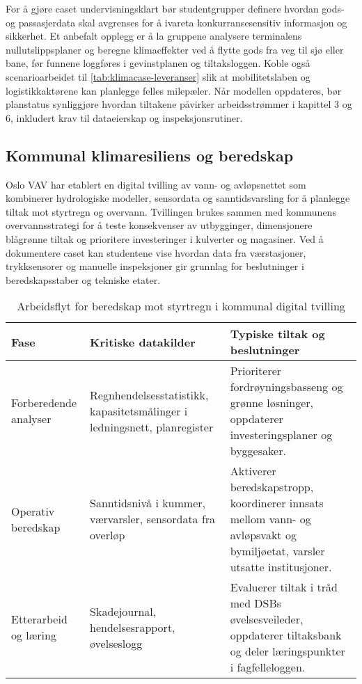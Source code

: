 For å gjøre caset undervisningsklart bør studentgrupper definere hvordan gods- og passasjerdata skal avgrenses for å ivareta konkurransesensitiv informasjon og sikkerhet. Et anbefalt opplegg er å la gruppene analysere terminalens nullutslippsplaner og beregne klimaeffekter ved å flytte gods fra veg til sjø eller bane, før funnene loggføres i gevinstplanen og tiltaksloggen. Koble også scenarioarbeidet til \autoref{tab:klimacase-leveranser} slik at mobilitetslaben og logistikkaktørene kan planlegge felles milepæler. Når modellen oppdateres, bør planstatus synliggjøre hvordan tiltakene påvirker arbeidsstrømmer i kapittel 3 og 6, inkludert krav til dataeierskap og inspeksjonsrutiner.

\subsection*{Kommunal klimaresiliens og beredskap}
Oslo VAV har etablert en digital tvilling av vann- og avløpsnettet som kombinerer hydrologiske modeller, sensordata og sanntidsvarsling for å planlegge tiltak mot styrtregn og overvann.\citep{oslovav2023digital} Tvillingen brukes sammen med kommunens overvannsstrategi for å teste konsekvenser av utbygginger, dimensjonere blågrønne tiltak og prioritere investeringer i kulverter og magasiner.\citep{oslo2023overvann} Ved å dokumentere caset kan studentene vise hvordan data fra værstasjoner, trykksensorer og manuelle inspeksjoner gir grunnlag for beslutninger i beredskapsstaber og tekniske etater.

\begin{table}[h]
    \centering
    \caption{Arbeidsflyt for beredskap mot styrtregn i kommunal digital tvilling}
    \label{tab:kommunal-beredskap}
    \begin{tabular}{p{3.4cm}p{4.5cm}p{5.0cm}}
        \toprule
        Fase & Kritiske datakilder & Typiske tiltak og beslutninger \\
        \midrule
        Forberedende analyser & Regnhendelsesstatistikk, kapasitetsmålinger i ledningsnett, planregister & Prioriterer fordrøyningsbasseng og grønne løsninger, oppdaterer investeringsplaner og byggesaker. \\
        Operativ beredskap & Sanntidsnivå i kummer, værvarsler, sensordata fra overløp & Aktiverer beredskapstropp, koordinerer innsats mellom vann- og avløpsvakt og bymiljøetat, varsler utsatte institusjoner. \\
        Etterarbeid og læring & Skadejournal, hendelsesrapport, øvelseslogg & Evaluerer tiltak i tråd med DSBs øvelsesveileder, oppdaterer tiltaksbank og deler læringspunkter i fagfelleloggen.\citep{dsb2024nser,dsb2023ovelser} \\
        \bottomrule
    \end{tabular}
\end{table}

